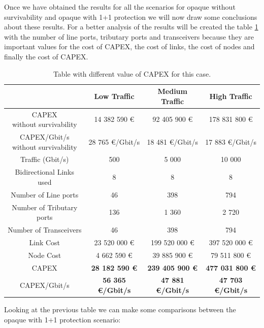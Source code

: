Once we have obtained the results for all the scenarios for opaque without survivability and opaque with 1+1 protection we will now draw some conclusions about these results. For a better analysis of the results will be created the table \ref{table_comparative_opaque_protec_heuristic} with the number of line ports, tributary ports and transceivers because they are important values for the cost of CAPEX, the cost of links, the cost of nodes and finally the cost of CAPEX.\\

\begin{table}[H]
\centering
\begin{tabular}{| c | c | c | c |}
 \hline
 & Low Traffic & Medium Traffic & High Traffic \\
 \hline\hline
 \makecell{CAPEX \\ without survivability} & 14 382 590 \euro & 92 405 900 \euro & 178 831 800 \euro \\ \hline
 \makecell{CAPEX/Gbit/s \\ without survivability} & 28 765 \euro/Gbit/s & 18 481 \euro/Gbit/s & 17 883 \euro/Gbit/s \\ \hline
 Traffic (Gbit/s) & 500 & 5 000 & 10 000 \\ \hline
 Bidirectional Links used & 8 & 8 & 8 \\ \hline
 Number of Line ports & 46 & 398 & 794 \\ \hline
 Number of Tributary ports & 136 & 1 360 & 2 720 \\ \hline
 Number of Transceivers & 46 & 398 & 794 \\ \hline
 Link Cost & 23 520 000 \euro & 199 520 000 \euro & 397 520 000 \euro \\ \hline
 Node Cost & 4 662 590 \euro & 39 885 900 \euro & 79 511 800 \euro \\ \hline
 CAPEX & \textbf{28 182 590 \euro} & \textbf{239 405 900 \euro} & \textbf{477 031 800 \euro} \\ \hline
 CAPEX/Gbit/s & \textbf{56 365 \euro/Gbit/s} & \textbf{47 881 \euro/Gbit/s} & \textbf{47 703 \euro/Gbit/s} \\ \hline
\end{tabular}
\caption{Table with different value of CAPEX for this case.}
\label{table_comparative_opaque_protec_heuristic}
\end{table}

Looking at the previous table we can make some comparisons between the opaque with 1+1 protection scenario:

